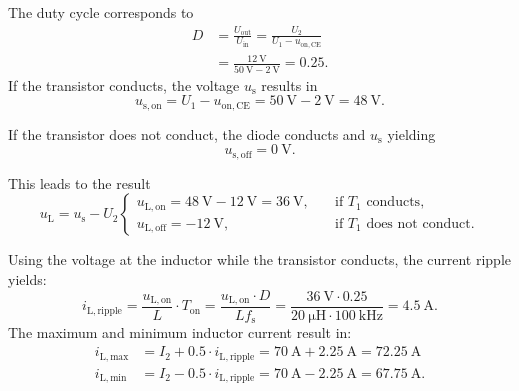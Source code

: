 \begin{solutionblock}
    The duty cycle corresponds to
    \begin{equation*}
        \begin{aligned}
            D&=\frac{U_\mathrm{out}}{U_\mathrm{in}}=\frac{U_\mathrm{2}}{U_\mathrm{1}-u_\mathrm{on,CE}} \\
            &=\frac{\SI{12}{\volt}}{\SI{50}{\volt}-\SI{2}{\volt}}=0.25.
        \end{aligned}
        \label{eq:dutycycle}
    \end{equation*}
    If the transistor conducts, the voltage $u_\mathrm{s}$ results in
    \begin{equation*}
        u_\mathrm{s,on}=U_\mathrm{1}-u_\mathrm{on,CE}=\SI{50}{\volt}-\SI{2}{\volt}=\SI{48}{\volt}.
        \label{eq:u_on}
    \end{equation*}

    If the transistor does not conduct, the diode conducts and $u_\mathrm{s}$ yielding
    \begin{equation*}
        u_\mathrm{s,off}=\SI{0}{\volt}.
        \label{eq:u_off}
    \end{equation*}

    This leads to the result
    \begin{equation*}
        u_\mathrm{L}= u_\mathrm{s}-U_\mathrm{2}
        \begin{cases}
            u_\mathrm{L,on}= \SI{48}{\volt}-\SI{12}{\volt} = \SI{36}{\volt}, \quad  &\text{if $T_1$ conducts}, \\
            u_\mathrm{L,off}= -\SI{12}{\volt}, \quad &\text{if $T_1$ does not conduct}.
        \end{cases}
        \label{eq:i_inductor}
    \end{equation*}

    Using the voltage at the inductor while the transistor conducts, the current ripple yields:
    \begin{equation*}
            i_\mathrm{L,ripple}= \frac{u_\mathrm{L,on}}{L} \cdot T_\mathrm{on} 
            =\frac{u_\mathrm{L,on} \cdot D}{L f_\mathrm{s}}
            =\frac{ \SI{36}{\volt} \cdot 0.25} {\SI{20}{\micro\henry} 
            \cdot \SI{100}{\kilo\hertz}} = \SI{4.5}{\ampere}.
        \label{eq:i_inductor}
    \end{equation*}
    The maximum and minimum inductor current result in:
    \begin{equation*}
        \begin{aligned}
            i_\mathrm{L,max}&= I_\mathrm{2} + 0.5 \cdot i_\mathrm{L,ripple} = \SI{70}{\ampere} + \SI{2.25}{\ampere} = \SI{72.25}{\ampere} \\
            i_\mathrm{L,min}&= I_\mathrm{2} - 0.5 \cdot i_\mathrm{L,ripple} = \SI{70}{\ampere} - \SI{2.25}{\ampere} = \SI{67.75}{\ampere}.
        \end{aligned}
        \label{eq:i_inductor}
    \end{equation*}
        
    

\end{solutionblock}

